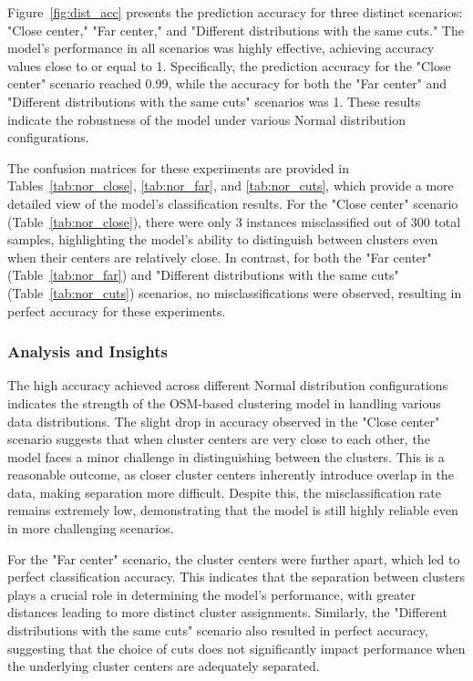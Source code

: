 \documentclass{article}
\begin{document}
Figure~\ref{fig:dist_acc} presents the prediction accuracy for three distinct scenarios: "Close center," "Far center," and "Different distributions with the same cuts." 
The model's performance in all scenarios was highly effective, achieving accuracy values close to or equal to 1. Specifically, the prediction accuracy for the "Close center" scenario reached 0.99, while the accuracy for both the "Far center" and "Different distributions with the same cuts" scenarios was 1. 
These results indicate the robustness of the model under various Normal distribution configurations.

The confusion matrices for these experiments are provided in Tables~\ref{tab:nor_close}, \ref{tab:nor_far}, and \ref{tab:nor_cuts}, which provide a more detailed view of the model's classification results. 
For the "Close center" scenario (Table~\ref{tab:nor_close}), there were only 3 instances misclassified out of 300 total samples, highlighting the model's ability to distinguish between clusters even when their centers are relatively close. 
In contrast, for both the "Far center" (Table~\ref{tab:nor_far}) and "Different distributions with the same cuts" (Table~\ref{tab:nor_cuts}) scenarios, no misclassifications were observed, resulting in perfect accuracy for these experiments.

\subsubsection*{Analysis and Insights}

The high accuracy achieved across different Normal distribution configurations indicates the strength of the OSM-based clustering model in handling various data distributions. 
The slight drop in accuracy observed in the "Close center" scenario suggests that when cluster centers are very close to each other, the model faces a minor challenge in distinguishing between the clusters. 
This is a reasonable outcome, as closer cluster centers inherently introduce overlap in the data, making separation more difficult. 
Despite this, the misclassification rate remains extremely low, demonstrating that the model is still highly reliable even in more challenging scenarios.

For the "Far center" scenario, the cluster centers were further apart, which led to perfect classification accuracy. 
This indicates that the separation between clusters plays a crucial role in determining the model's performance, with greater distances leading to more distinct cluster assignments. 
Similarly, the "Different distributions with the same cuts" scenario also resulted in perfect accuracy, suggesting that the choice of cuts does not significantly impact performance when the underlying cluster centers are adequately separated.
\end{document}
